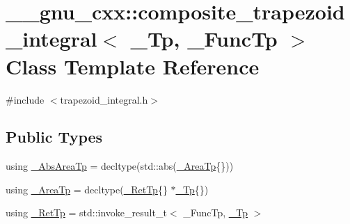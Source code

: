 \hypertarget{class____gnu__cxx_1_1composite__trapezoid__integral}{}\section{\+\_\+\+\_\+gnu\+\_\+cxx\+:\+:composite\+\_\+trapezoid\+\_\+integral$<$ \+\_\+\+Tp, \+\_\+\+Func\+Tp $>$ Class Template Reference}
\label{class____gnu__cxx_1_1composite__trapezoid__integral}


{\ttfamily \#include $<$trapezoid\+\_\+integral.\+h$>$}

\subsection*{Public Types}
\begin{DoxyCompactItemize}
\item 
using \hyperlink{class____gnu__cxx_1_1composite__trapezoid__integral_a3e05f617e964dd6ec4ae2e42c600c1a7}{\+\_\+\+Abs\+Area\+Tp} = decltype(std\+::abs(\hyperlink{class____gnu__cxx_1_1composite__trapezoid__integral_a0839ba042e2636869679bbf343b2a930}{\+\_\+\+Area\+Tp}\{\}))
\item 
using \hyperlink{class____gnu__cxx_1_1composite__trapezoid__integral_a0839ba042e2636869679bbf343b2a930}{\+\_\+\+Area\+Tp} = decltype(\hyperlink{class____gnu__cxx_1_1composite__trapezoid__integral_af223f0ed55e750221cb3114c6f2fcb60}{\+\_\+\+Ret\+Tp}\{\} $\ast$\hyperlink{namespace____gnu__cxx_a3b19a9c800ca194374ef9172290f7d79}{\+\_\+\+Tp}\{\})
\item 
using \hyperlink{class____gnu__cxx_1_1composite__trapezoid__integral_af223f0ed55e750221cb3114c6f2fcb60}{\+\_\+\+Ret\+Tp} = std\+::invoke\+\_\+result\+\_\+t$<$ \+\_\+\+Func\+Tp, \hyperlink{namespace____gnu__cxx_a3b19a9c800ca194374ef9172290f7d79}{\+\_\+\+Tp} $>$
\end{DoxyCompactItemize}
